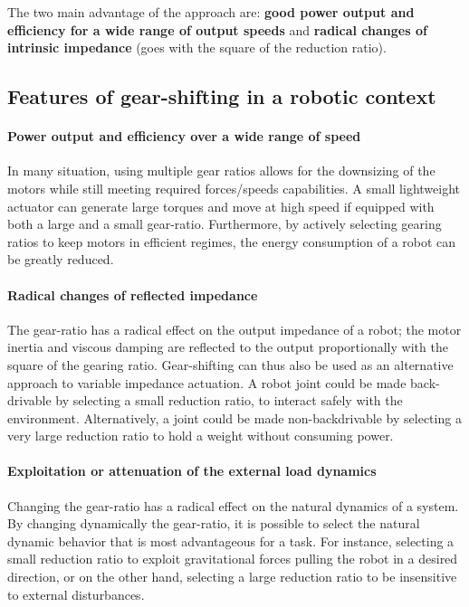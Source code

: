 The two main advantage of the approach are: \textbf{good power output and efficiency for a wide range of output speeds} and \textbf{radical changes of intrinsic impedance} (goes with the square of the reduction ratio). 

\subsection{Features of gear-shifting in a robotic context}

\paragraph{Power output and efficiency over a wide range of speed}
In many situation, using multiple gear ratios allows for the downsizing of the motors while still meeting required forces/speeds capabilities. A small lightweight actuator can generate large torques and move at high speed if equipped with both a large and a small gear-ratio. Furthermore, by actively selecting gearing ratios to keep motors in efficient regimes, the energy consumption of a robot can be greatly reduced. 

\paragraph{Radical changes of reflected impedance}
The gear-ratio has a radical effect on the output impedance of a robot; the motor inertia and viscous damping are reflected to the output proportionally with the square of the gearing ratio. Gear-shifting can thus also be used as an alternative approach to variable impedance actuation. A robot joint could be made back-drivable by selecting a small reduction ratio, to interact safely with the environment.  Alternatively, a joint could be made non-backdrivable by selecting a very large reduction ratio to hold a weight without consuming power.

\paragraph{Exploitation or attenuation of the external load dynamics}
Changing the gear-ratio has a radical effect on the natural dynamics of a system. By changing dynamically the gear-ratio, it is possible to select the natural dynamic behavior that is most advantageous for a task. For instance, selecting a small reduction ratio to exploit gravitational forces pulling the robot in a desired direction, or on the other hand, selecting a large reduction ratio to be insensitive to external disturbances.

